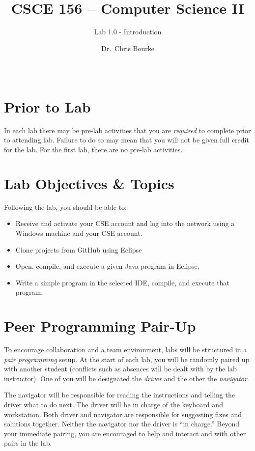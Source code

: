 \documentclass[12pt]{scrartcl}
\title{CSCE 156 -- Computer Science II}
\subtitle{Lab 1.0 - Introduction}
\author{Dr.\ Chris Bourke}
\date{~}
\begin{document}
\maketitle

\section*{Prior to Lab}

In each lab there may be pre-lab activities that you are \emph{required} to
complete prior to attending lab.  Failure to do so may mean that you will
not be given full credit for the lab.  For the first lab, there are no pre-lab
activities.

\section{Lab Objectives \& Topics}
Following the lab, you should be able to:
\begin{itemize}
  \item Receive and activate your CSE account and log into the network 
  	using a Windows machine and your CSE account.
  \item Clone projects from GitHub using Eclipse
  \item Open, compile, and execute a given Java program in Eclipse.
  \item Write a simple program in the selected IDE, compile, and 
  	execute that program.
\end{itemize}

\section*{Peer Programming Pair-Up}

To encourage collaboration and a team environment, labs will be
structured in a \emph{pair programming} setup.  At the start of
each lab, you will be randomly paired up with another student 
(conflicts such as absences will be dealt with by the lab instructor).
One of you will be designated the \emph{driver} and the other
the \emph{navigator}.  

The navigator will be responsible for reading the instructions and
telling the driver what to do next.  The driver will be in charge of the
keyboard and workstation.  Both driver and navigator are responsible
for suggesting fixes and solutions together.  Neither the navigator
nor the driver is ``in charge.''  Beyond your immediate pairing, you
are encouraged to help and interact and with other pairs in the lab.
\end{document}
